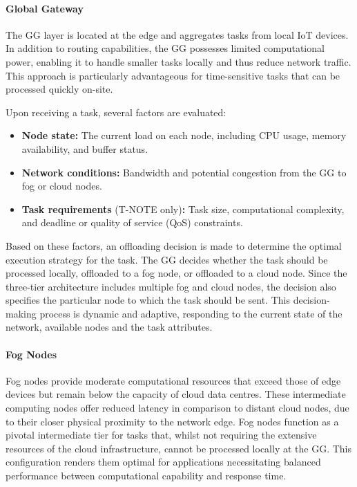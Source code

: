 \documentclass[preprint,3p,authoryear]{elsarticle}
\begin{document}
\paragraph{Global Gateway}\label{subsubsec:GG}

The GG layer is located at the edge and aggregates tasks from local IoT devices. In addition to routing capabilities, the GG possesses limited computational power, enabling it to handle smaller tasks locally and thus reduce network traffic. This approach is particularly advantageous for time-sensitive tasks that can be processed quickly on-site.

Upon receiving a task, several factors are evaluated:
\begin{itemize}
    \item \textbf{Node state:} The current load on each node, including CPU usage, memory availability, and buffer status.
    \item \textbf{Network conditions:} Bandwidth and potential congestion from the GG to fog or cloud nodes.
    \item \textbf{Task requirements} (T-NOTE only)\textbf{:} Task size, computational complexity, and deadline or quality of service (QoS) constraints.
\end{itemize}

Based on these factors, an offloading decision is made to determine the optimal execution strategy for the task. The GG decides whether the task should be processed locally, offloaded to a fog node, or offloaded to a cloud node. Since the three-tier architecture includes multiple fog and cloud nodes, the decision also specifies the particular node to which the task should be sent. This decision-making process is dynamic and adaptive, responding to the current state of the network, available nodes and the task attributes.



\paragraph{Fog Nodes}\label{subsubsec:Fog}

Fog nodes provide moderate computational resources that exceed those of edge devices but remain below the capacity of cloud data centres. These intermediate computing nodes offer reduced latency in comparison to distant cloud nodes, due to their closer physical proximity to the network edge. Fog nodes function as a pivotal intermediate tier for tasks that, whilst not requiring the extensive resources of the cloud infrastructure, cannot be processed locally at the GG. This configuration renders them optimal for applications necessitating balanced performance between computational capability and response time.
\end{document}
